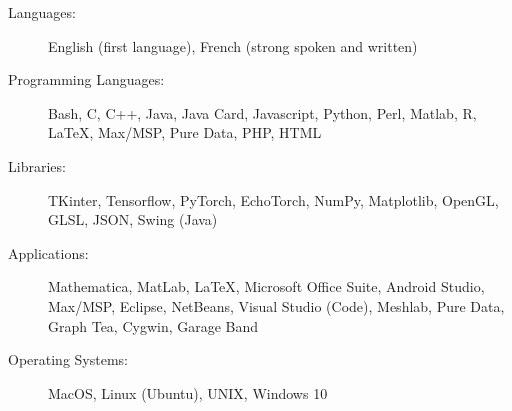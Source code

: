 \documentclass[letterpaper,11pt]{article}
\begin{document}
\begin{description}
\item[Languages:]
English (first language), French (strong spoken and written)

\item[Programming Languages:]
Bash, C, C++, Java, Java Card, Javascript, Python, Perl, Matlab, R, \LaTeX, Max/MSP, Pure Data, PHP, HTML

\item[Libraries:]
TKinter, Tensorflow, PyTorch, EchoTorch, NumPy, Matplotlib, OpenGL, GLSL, JSON, Swing (Java)

\item[Applications:]
Mathematica, MatLab, \LaTeX, Microsoft Office Suite, Android Studio, Max/MSP, Eclipse, NetBeans, Visual Studio (Code), Meshlab, Pure Data, Graph Tea, Cygwin, Garage Band

\item[Operating Systems:]
MacOS, Linux (Ubuntu), UNIX, Windows 10
\end{description}
\end{document}
